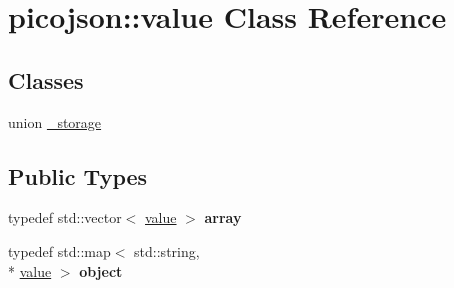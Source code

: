 \hypertarget{classpicojson_1_1value}{\section{picojson\-:\-:value Class Reference}
\label{classpicojson_1_1value}
}
\subsection*{Classes}
\begin{DoxyCompactItemize}
\item 
union \hyperlink{unionpicojson_1_1value_1_1__storage}{\-\_\-storage}
\end{DoxyCompactItemize}
\subsection*{Public Types}
\begin{DoxyCompactItemize}
\item 
\hypertarget{classpicojson_1_1value_adeff4fdf7ee5675eeb7686bb89233c43}{typedef std\-::vector$<$ \hyperlink{classpicojson_1_1value}{value} $>$ {\bfseries array}}\label{classpicojson_1_1value_adeff4fdf7ee5675eeb7686bb89233c43}

\item 
\hypertarget{classpicojson_1_1value_a7d7da11d54d7b983a902d28367bda9c1}{typedef std\-::map$<$ std\-::string, \\*
\hyperlink{classpicojson_1_1value}{value} $>$ {\bfseries object}}\label{classpicojson_1_1value_a7d7da11d54d7b983a902d28367bda9c1}

\end{DoxyCompactItemize}
